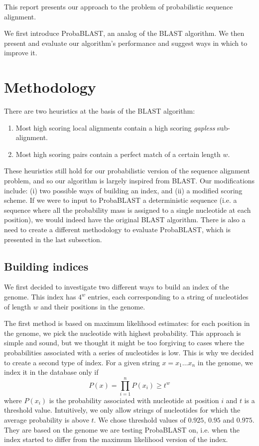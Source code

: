 \documentclass[11pt]{IEEEtran}
\begin{document}
This report presents our approach to the problem of probabilistic sequence alignment. 

We first introduce ProbaBLAST, an analog of the BLAST algorithm. We then present and evaluate our algorithm's performance and suggest ways in which to improve it.

\section{Methodology}

There are two heuristics at the basis of the BLAST algorithm:
\begin{enumerate}
\item Most high scoring local alignments contain a high scoring \emph{gapless} sub-alignment.
\item Most high scoring pairs contain a perfect match of a certain length $w$.
\end{enumerate}
These heuristics still hold for our probabilistic version of the sequence alignment problem, and so our algorithm is largely inspired from BLAST. Our modifications include: (i) two possible ways of building an index, and (ii) a modified scoring scheme. If we were to input to ProbaBLAST a deterministic sequence (i.e. a sequence where all the probability mass is assigned to a single nucleotide at each position), we would indeed have the original BLAST algorithm. There is also a need to create a different methodology to evaluate ProbaBLAST, which is presented in the last subsection.

\subsection{Building indices}

We first decided to investigate two different ways to build an index of the genome. This index has $4^w$ entries, each corresponding to a string of nucleotides of length $w$ and their positions in the genome.

The first method is based on maximum likelihood estimates: for each position in the genome, we pick the nucleotide with highest probability. This approach is simple and sound, but we thought it might be too forgiving to cases where the probabilities associated with a series of nucleotides is low.
This is why we decided to create a second type of index. For a given string $x=x_1\dots x_n$ in the genome, we index it in the database only if 
$$P(x)=\prod_{i=1}^{n}P(x_i)\geq t^w$$
where $P(x_i)$ is the probability associated with nucleotide at position $i$ and $t$ is a threshold value. Intuitively, we only allow strings of nucleotides for which the average probability is above $t$. We chose threshold values of $0.925$, $0.95$ and $0.975$. They are based on the genome we are testing ProbaBLAST on, i.e. when the index started to differ from the maximum likelihood version of the index.
\end{document}
